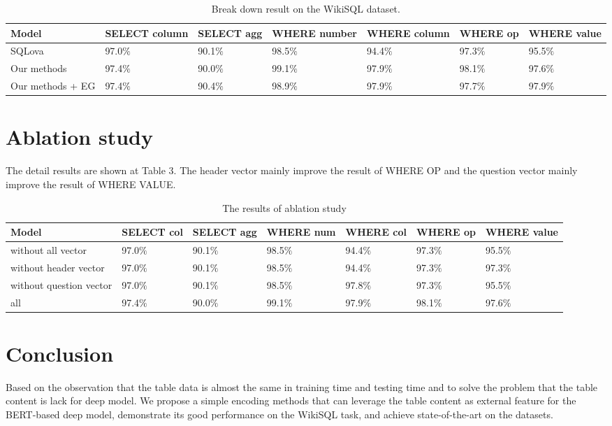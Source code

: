 \documentclass{llncs}
\begin{document}
\begin{table}
\caption{Break down result on the WikiSQL dataset.}\label{tab1}
\centering
\begin{tabular}{|l|l|l|l|l|l|l|}
\hline
Model & SELECT column & SELECT agg & WHERE number & WHERE column & WHERE op & WHERE value\\
\hline
SQLova\cite{ref_proc3} & 97.0$\%$ & 90.1$\%$ & 98.5$\%$ & 94.4$\%$& 97.3$\%$ & 95.5$\%$ \\ 
\hline
Our methods & 97.4$\%$ & 90.0$\%$ & 99.1$\%$ & 97.9$\%$ & 98.1$\%$ &97.6$\%$\\
\hline
Our methods + EG & 97.4$\%$ & 90.4$\%$ & 98.9$\%$ & 97.9$\%$ & 97.7$\%$ &97.9$\%$\\
\hline
\end{tabular}
\end{table}

\section{Ablation study}
The detail results are shown at Table 3. The header vector mainly improve the result of WHERE OP and the question vector mainly improve the result of WHERE VALUE.

\begin{table}
\caption{The results of ablation study}\label{tab1}
\centering
\begin{tabular}{|l|l|l|l|l|l|l|}
\hline
Model & SELECT col & SELECT agg & WHERE num & WHERE col & WHERE op & WHERE value\\
\hline
without all vector & 97.0$\%$ & 90.1$\%$ & 98.5$\%$ & 94.4$\%$& 97.3$\%$ & 95.5$\%$ \\ 
\hline
without header vector & 97.0$\%$ & 90.1$\%$ & 98.5$\%$ & 94.4$\%$ & 97.3$\%$ &97.3$\%$\\
\hline
without question vector & 97.0$\%$ & 90.1$\%$ & 98.5$\%$ & 97.8$\%$ & 97.3$\%$ &95.5$\%$\\
\hline
all  & 97.4$\%$ & 90.0$\%$ & 99.1$\%$ & 97.9$\%$ & 98.1$\%$ &97.6$\%$\\
\hline
\end{tabular}
\end{table}


\section{Conclusion}

Based on the observation that the table data is almost the same in training time and testing time and to solve the problem that the table content is lack for deep model. We propose a simple encoding methods that can leverage the table content as external feature for the BERT-based deep model, demonstrate its good performance on the WikiSQL task, and achieve state-of-the-art on the datasets. 
\end{document}
